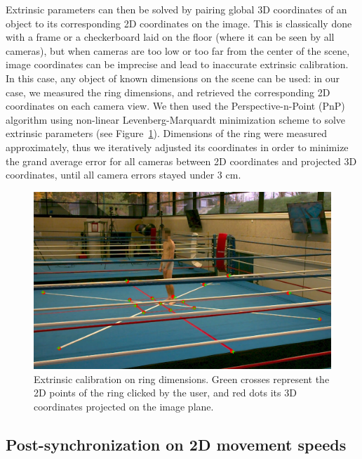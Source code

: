 \newpage
Extrinsic parameters can then be solved by pairing global 3D coordinates of an object to its corresponding 2D coordinates on the image. This is classically done with a frame or a checkerboard laid on the floor (where it can be seen by all cameras), but when cameras are too low or too far from the center of the scene, image coordinates can be imprecise and lead to inaccurate extrinsic calibration. In this case, any object of known dimensions on the scene can be used: in our case, we measured the ring dimensions, and retrieved the corresponding 2D coordinates on each camera view. We then used the Perspective-n-Point (PnP) algorithm using non-linear Levenberg-Marquardt minimization scheme \cite{More1978} to solve extrinsic parameters \cite{Marchand2015} (see Figure~\ref{fig_calib}). Dimensions of the ring were measured approximately, thus we iteratively adjusted its coordinates in order to minimize the grand average error for all cameras between 2D coordinates and projected 3D coordinates, until all camera errors stayed under 3 cm. 

\begin{figure}[!ht]
	\centering
	\def\svgwidth{1\columnwidth}
	\fontsize{10pt}{10pt}\selectfont
	\includegraphics[width=\linewidth]{"../Chap6/Figures/Fig_Calib.png"}
	\caption{Extrinsic calibration on ring dimensions. Green crosses represent the 2D points of the ring clicked by the user, and red dots its 3D coordinates projected on the image plane.}
	\label{fig_calib}
\end{figure}


\subsection{Post-synchronization on 2D movement speeds}

